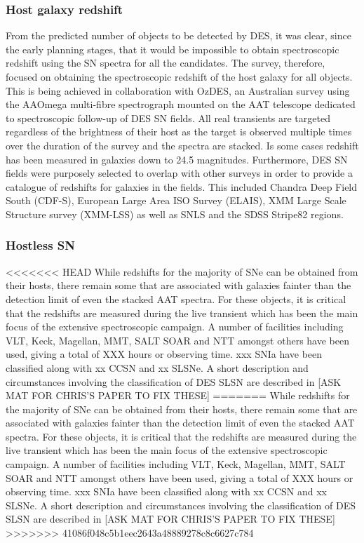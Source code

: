 \subsubsection{Host galaxy redshift}
From the predicted number of objects to be detected by DES, it was clear, since the early planning stages, that it would be impossible to obtain spectroscopic redshift using the SN spectra for all the candidates. The survey, therefore, focused on obtaining the spectroscopic redshift of the host galaxy for all objects. This is being achieved in collaboration with OzDES, an Australian survey using the AAOmega multi-fibre spectrograph mounted on the AAT telescope dedicated to spectroscopic follow-up of DES SN fields. All real transients are targeted regardless of the brightness of their host as the target is observed multiple times over the duration of the survey and the spectra are stacked. Is some cases redshift has been measured in galaxies down to 24.5 magnitudes. Furthermore, DES SN fields were purposely selected to overlap with other surveys in order to provide a catalogue of redshifts for galaxies in the fields. This included Chandra Deep Field South (CDF-S), European Large Area ISO Survey (ELAIS), XMM Large Scale Structure survey (XMM-LSS) as well as SNLS and the SDSS Stripe82 regions.

\subsubsection{Hostless SN}
<<<<<<< HEAD
While redshifts for the majority of SNe can be obtained from their hosts, there remain some that are associated with galaxies fainter than the detection limit of even the stacked AAT spectra. For these objects, it is critical that the redshifts are measured during the live transient which has been the main focus of the extensive spectroscopic campaign. A number of facilities including VLT, Keck, Magellan, MMT, SALT SOAR and NTT amongst others have been used, giving a total of XXX hours or observing time. xxx SNIa have been classified along with xx CCSN and xx SLSNe. A short description and circumstances involving the classification of DES SLSN are described in  [ASK MAT FOR CHRIS'S PAPER TO FIX THESE]
=======
While redshifts for the majority of SNe can be obtained from their hosts, there remain some that are associated with galaxies fainter than the detection limit of even the stacked AAT spectra. For these objects, it is critical that the redshifts are measured during the live transient which has been the main focus of the extensive spectroscopic campaign. A number of facilities including VLT, Keck, Magellan, MMT, SALT SOAR and NTT amongst others have been used, giving a total of XXX hours or observing time. xxx SNIa have been classified along with xx CCSN and xx SLSNe. A short description and circumstances involving the classification of DES SLSN are described in  [ASK MAT FOR CHRIS'S PAPER TO FIX THESE]
>>>>>>> 41086f048c5b1eec2643a48889278c8c6627c784

